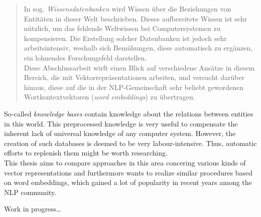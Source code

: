 \documentclass[
captions=nooneline,
11pt, %
ngerman, %
singlespacing, %
headsepline, %
]{MastersDoctoralThesis} %
\begin{document}
\begin{abstract}
\addchaptertocentry{\abstractname} %

In sog. \emph{Wissensdatenbanken} wird Wissen über die Beziehungen von Entitäten in dieser Welt
beschrieben. Dieses aufbereitete Wissen ist sehr nützlich, um das fehlende Weltwissen
bei Computersystemen zu kompensieren. Die Erstellung solcher Datenbanken ist jedoch sehr
arbeitsintensiv, weshalb sich Bemühungen, diese automatisch zu ergänzen, ein lohnendes Forschungsfeld darstellen.\\
Diese Abschlussarbeit wirft einen Blick auf verschiedene Ansätze in diesem Bereich, die mit
Vektorrepräsentationen arbeiten, und versucht darüber hinaus, diese auf die in der NLP-Gemeinschaft
sehr beliebt gewordenen Wortkontextvektoren (\emph{word embeddings}) zu übertragen.

\end{abstract}


\begin{abstracteng}

So-called \emph{knowledge bases} contain knowledge about the relations between entities in
this world. This preprocessed knowledge is very useful to compensate the inherent lack of universal knowledge
of any computer system. However, the creation of such databases is deemed to be very labour-intensive.
Thus, automatic efforts to replenish them might be worth researching.\\
This thesis aims to compare approaches in this area concering various kinds of
vector representations and furthermore wants to realize similar procedures based on word embeddings,
which gained a lot of popularity in recent years among the NLP community.

\end{abstracteng}



\begin{acknowledgements}
\addchaptertocentry{\acknowledgementname} %

Work in progress\ldots

\end{acknowledgements}
\end{document}
